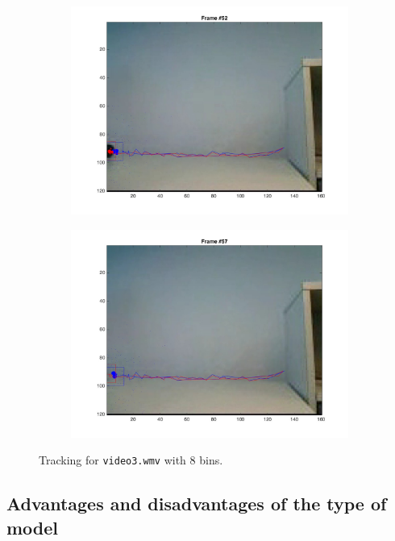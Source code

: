 \documentclass{ethz_report}
\begin{document}
\begin{figure}[h]
\begin{subfigure}[b]{.25\textwidth}
        \includegraphics[width=1\linewidth]{images/video3_bins_low_51}
    \end{subfigure}%
    \begin{subfigure}[b]{.25\textwidth}
        \centering
        \includegraphics[width=1\linewidth]{images/video3_bins_low_56}
    \end{subfigure}
    \caption{Tracking for \texttt{video3.wmv} with 8 bins.}
    \label{fig:tracking_video3_bins_low}
\end{figure}

\subsection*{Advantages and disadvantages of the type of model}
\end{document}
